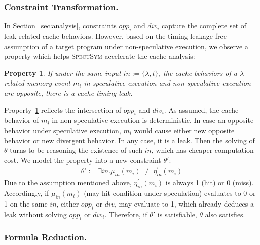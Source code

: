 \documentclass[sigconf,screen]{acmart}
\newcommand{\SpecuSym}{\textsc{SpecuSym} }
\newtheorem{pro}{Property}
\begin{document}
\subsubsection{Constraint Transformation.}
In Section~\ref{sec:analysis}, constraints $\mathit{opp_i}$ and $\mathit{div_i}$
capture the complete set of leak-related cache behaviors. However, based on the
timing-leakage-free assumption of a target program under non-speculative execution,
we observe a property which helps \SpecuSym accelerate the cache analysis:
%
\begin{pro}
  \label{pro:p2}
  If under the same input $\mathit{in:=\{\lambda,t\}}$, the cache behaviors of a 
	$\lambda$-related	memory event $\mathit{m_i}$ in speculative execution and 
	non-speculative execution are opposite, there is a cache timing leak. 
\end{pro}
%
Property~\ref{pro:p2} reflects the intersection of $\mathit{opp_i}$ and 
$\mathit{div_i}$. As assumed, the cache behavior of $\mathit{m_i}$ in 
non-speculative execution is deterministic. In case an opposite behavior 
under speculative execution, $\mathit{m_i}$ would cause either new opposite 
behavior or new divergent behavior. In any case, it is a leak. Then the 
solving of $\theta$ turns to be reasoning the existence of such $\mathit{in}$, 
which has cheaper computation cost. We model the property into a new constraint 
$\theta'$:  
%
\begin{multline}
  \label{eqn:leak}
  ~~~~~~~~~~~~~~~
  \theta':=
  \exists\mathit{in}.
  \mathit{
    \mu_{in}(m_i)~\neq~\eta_{in}^\prime(m_i)
  }
  ~~~~~~~~~~~~~~~
\end{multline}
%
Due to the assumption mentioned above, $\mathit{\eta_{in}^\prime(m_i)}$ 
is always 1 (hit) or 0 (miss). Accordingly, if $\mathit{\mu_{in}(m_i)}$
(may-hit condition under speculation) evaluates to 0 or 1 on the same 
$\mathit{in}$, either $\mathit{opp_i}$ or $\mathit{div_i}$ may evaluate 
to 1, which already deduces a leak without solving $\mathit{opp_i}$ or 
$\mathit{div_i}$. Therefore, if $\theta'$ is satisfiable, $\theta$ also 
satisfies. 


\subsubsection{Formula Reduction.}
\end{document}

